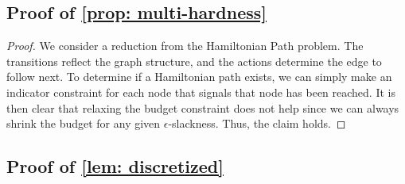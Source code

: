\documentclass[pdftex, a4paper, 12pt]{article}
\begin{document}
\subsection{Proof of \texorpdfstring{\cref{prop: multi-hardness}}{prop: multi-hardness}}

\begin{proof}
    We consider a reduction from the Hamiltonian Path problem. The transitions reflect the graph structure, and the actions determine the edge to follow next. To determine if a Hamiltonian path exists, we can simply make an indicator constraint for each node that signals that node has been reached. It is then clear that relaxing the budget constraint does not help since we can always shrink the budget for any given $\epsilon$-slackness. Thus, the claim holds.
\end{proof}

\subsection{Proof of \texorpdfstring{\cref{lem: discretized}}{lem: discretized}}
\end{document}
